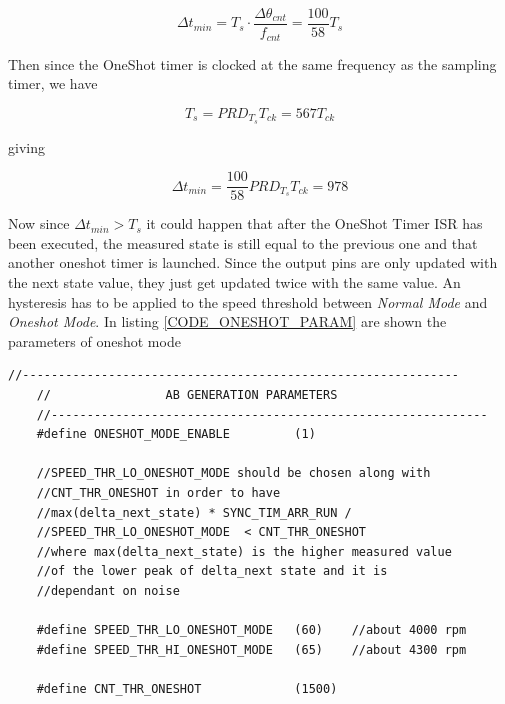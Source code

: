 \documentclass[main]{subfiles}
\begin{document}
\begin{equation}
    \Delta t_{min} = T_s \cdot \frac{\Delta \theta_{cnt}}{f_{cnt}} = \frac{100}{58} T_s
\end{equation}

Then since the OneShot timer is clocked at the same frequency as the sampling timer,
we have 

\begin{equation}
    T_s = PRD_{T_s} T_{ck} = 567 T_{ck}
\end{equation}

giving

\begin{equation}
    \Delta t_{min} = \frac{100}{58} PRD_{T_s} T_{ck} = 978
\end{equation}

Now since $\Delta t_{min} > T_s$ it could happen that after the OneShot Timer 
\ac{ISR} has been executed, the measured state is still equal to the previous one 
and that another oneshot timer is launched. Since the output pins are only updated 
with the next state value, they just get updated twice with the same value.
An hysteresis has to be applied to the speed threshold between 
{\it Normal Mode} and {\it Oneshot Mode}.
In listing \ref {CODE_ONESHOT_PARAM} are shown the parameters of oneshot mode 

\begin{minipage}[h]{\linewidth}
\begin{lstlisting}[caption=AB Generation Parameters,label=CODE_ONESHOT_PARAM]
    //-------------------------------------------------------------
    //                AB GENERATION PARAMETERS
    //-------------------------------------------------------------
    #define ONESHOT_MODE_ENABLE         (1)

    //SPEED_THR_LO_ONESHOT_MODE should be chosen along with 
    //CNT_THR_ONESHOT in order to have 
    //max(delta_next_state) * SYNC_TIM_ARR_RUN / 
    //SPEED_THR_LO_ONESHOT_MODE  < CNT_THR_ONESHOT
    //where max(delta_next_state) is the higher measured value 
    //of the lower peak of delta_next state and it is 
    //dependant on noise

    #define SPEED_THR_LO_ONESHOT_MODE   (60)    //about 4000 rpm
    #define SPEED_THR_HI_ONESHOT_MODE   (65)    //about 4300 rpm

    #define CNT_THR_ONESHOT             (1500)  

\end{lstlisting}
\end{minipage}
\end{document}
